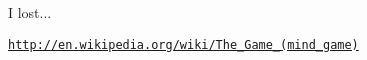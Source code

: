 I lost...

\href{http://en.wikipedia.org/wiki/The_Game_(mind_game)}{\tt http://en.wikipedia.org/wiki/The\_\-Game\_\-(mind\_\-game)} 
